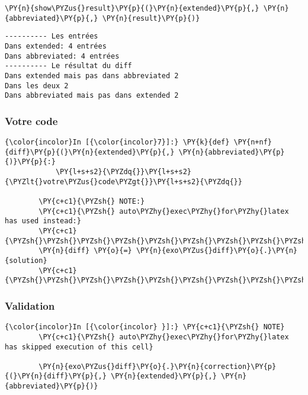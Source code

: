 \begin{Verbatim}[commandchars=\\\{\}]
        \PY{n}{show\PYZus{}result}\PY{p}{(}\PY{n}{extended}\PY{p}{,} \PY{n}{abbreviated}\PY{p}{,} \PY{n}{result}\PY{p}{)}
\end{Verbatim}


    \begin{Verbatim}[commandchars=\\\{\}]
---------- Les entrées
Dans extended: 4 entrées
Dans abbreviated: 4 entrées
---------- Le résultat du diff
Dans extended mais pas dans abbreviated 2
Dans les deux 2
Dans abbreviated mais pas dans extended 2

    \end{Verbatim}

    \hypertarget{votre-code}{%
\subsubsection{Votre code}\label{votre-code}}

    \begin{Verbatim}[commandchars=\\\{\}]
{\color{incolor}In [{\color{incolor}7}]:} \PY{k}{def} \PY{n+nf}{diff}\PY{p}{(}\PY{n}{extended}\PY{p}{,} \PY{n}{abbreviated}\PY{p}{)}\PY{p}{:}
            \PY{l+s+s2}{\PYZdq{}}\PY{l+s+s2}{\PYZlt{}votre\PYZus{}code\PYZgt{}}\PY{l+s+s2}{\PYZdq{}}
        
        \PY{c+c1}{\PYZsh{} NOTE:}
        \PY{c+c1}{\PYZsh{} auto\PYZhy{}exec\PYZhy{}for\PYZhy{}latex has used instead:}
        \PY{c+c1}{\PYZsh{}\PYZsh{}\PYZsh{}\PYZsh{}\PYZsh{}\PYZsh{}\PYZsh{}\PYZsh{}\PYZsh{}\PYZsh{}}
        \PY{n}{diff} \PY{o}{=} \PY{n}{exo\PYZus{}diff}\PY{o}{.}\PY{n}{solution}
        \PY{c+c1}{\PYZsh{}\PYZsh{}\PYZsh{}\PYZsh{}\PYZsh{}\PYZsh{}\PYZsh{}\PYZsh{}\PYZsh{}\PYZsh{}}
\end{Verbatim}


    \hypertarget{validation}{%
\subsubsection{Validation}\label{validation}}

    \begin{Verbatim}[commandchars=\\\{\}]
{\color{incolor}In [{\color{incolor} }]:} \PY{c+c1}{\PYZsh{} NOTE}
        \PY{c+c1}{\PYZsh{} auto\PYZhy{}exec\PYZhy{}for\PYZhy{}latex has skipped execution of this cell}
        
        \PY{n}{exo\PYZus{}diff}\PY{o}{.}\PY{n}{correction}\PY{p}{(}\PY{n}{diff}\PY{p}{,} \PY{n}{extended}\PY{p}{,} \PY{n}{abbreviated}\PY{p}{)}
\end{Verbatim}


